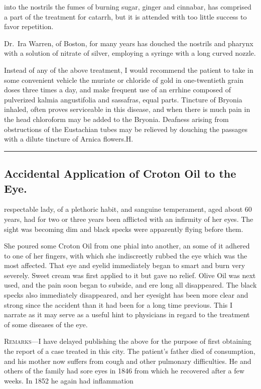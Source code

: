into the nostrils the fumes of burning sugar, ginger and cinnabar,
has comprised a part of the treatment for catarrh, but it is attended
with too little success to favor repetition.

Dr.~Ira Warren, of Boston, for many years has douched the nostrils
and pharynx with a solution of nitrate of silver, employing a syringe
with a long curved nozzle.

Instead of any of the above treatment, I would recommend the patient
to take in some convenient vehicle the muriate or chloride of gold
in one-twentieth grain doses three times a day, and make frequent use
of an errhine composed of pulverized kalmia angustifolia and sassafras,
equal parts. Tincture of Bryonia inhaled, often proves serviceable in
this disease, and when there is much pain in the head chloroform may
be added to the Bryonia. Deafness arising from obstructions of the
Eustachian tubes may be relieved by douching the passages with a dilute
tincture of Arnica flowers.\hfill{}H.\quad{}

\fancybreak{* * *}

\subsection*{Accidental Application of Croton Oil to the Eye.}


 respectable lady, of a plethoric habit, and sanguine temperament,
aged about 60 years, had for two or three years been afflicted
with an infirmity of her eyes. The sight was becoming dim and black
specks were apparently flying before them.

She poured some Croton Oil from one phial into another, an some
of it adhered to one of her fingers, with which she indiscreetly rubbed
the eye which was the most affected. That eye and eyelid immediately
began to smart and burn very severely. Sweet cream was first applied
to it but gave no relief. Olive Oil was next used, and the pain soon began
to subside, and ere long all disappeared. The black specks also immediately
disappeared, and her eyesight has been more clear and strong
since the accident than it had been for a long time previous. This I narrate
as it may serve as a useful hint to physicians in regard to the treatment
of some diseases of the eye.

\textsc{Remarks}---I have delayed publishing the above for the purpose of first
obtaining the report of a case treated in this city. The patient's father
died of consumption, and his mother now suffers from cough and other
pulmonary difficulties. He and others of the family had sore eyes in 1846
from which he recovered after a few weeks. In 1852 he again had inflammation\endinput
